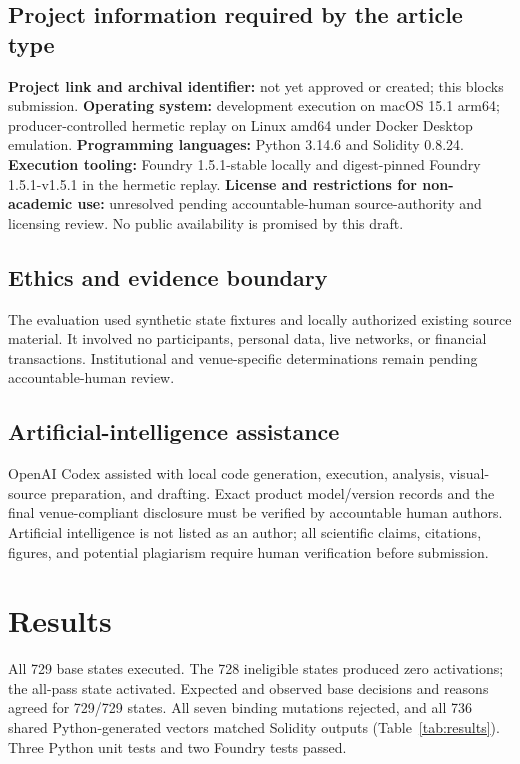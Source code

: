 \documentclass[utf8]{FrontiersinHarvard}
\begin{document}
\subsection{Project information required by the article type}

\textbf{Project link and archival identifier:} not yet approved or created; this blocks submission. \textbf{Operating system:} development execution on macOS 15.1 arm64; producer-controlled hermetic replay on Linux amd64 under Docker Desktop emulation. \textbf{Programming languages:} Python 3.14.6 and Solidity 0.8.24. \textbf{Execution tooling:} Foundry 1.5.1-stable locally and digest-pinned Foundry 1.5.1-v1.5.1 in the hermetic replay. \textbf{License and restrictions for non-academic use:} unresolved pending accountable-human source-authority and licensing review. No public availability is promised by this draft.

\subsection{Ethics and evidence boundary}

The evaluation used synthetic state fixtures and locally authorized existing source material. It involved no participants, personal data, live networks, or financial transactions. Institutional and venue-specific determinations remain pending accountable-human review.

\subsection{Artificial-intelligence assistance}

OpenAI Codex assisted with local code generation, execution, analysis, visual-source preparation, and drafting. Exact product model/version records and the final venue-compliant disclosure must be verified by accountable human authors. Artificial intelligence is not listed as an author; all scientific claims, citations, figures, and potential plagiarism require human verification before submission.

\section{Results}

All 729 base states executed. The 728 ineligible states produced zero activations; the all-pass state activated. Expected and observed base decisions and reasons agreed for 729/729 states. All seven binding mutations rejected, and all 736 shared Python-generated vectors matched Solidity outputs (Table~\ref{tab:results}). Three Python unit tests and two Foundry tests passed.
\end{document}
